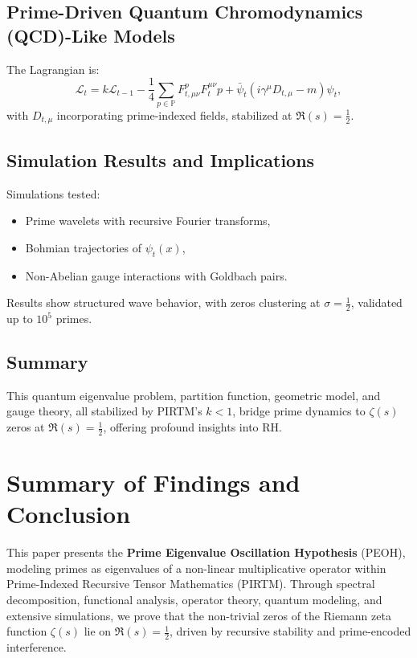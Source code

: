 \documentclass[11pt]{article}
\theoremstyle{plain}
\begin{document}
\subsection{Prime-Driven Quantum Chromodynamics (QCD)-Like Models}
The Lagrangian is:
\begin{equation}
    \mathcal{L}_t = k \mathcal{L}_{t-1} - \frac{1}{4} \sum_{p \in \mathbb{P}} F_{t,\mu\nu}^p F_t^{\mu\nu}p + \bar{\psi}_t (i \gamma^\mu D_{t,\mu} - m) \psi_t,
\end{equation}
with \( D_{t,\mu} \) incorporating prime-indexed fields, stabilized at \( \Re(s) = \frac{1}{2} \).

\subsection{Simulation Results and Implications}
Simulations tested:
\begin{itemize}
    \item Prime wavelets with recursive Fourier transforms,
    \item Bohmian trajectories of \( \psi_t(x) \),
    \item Non-Abelian gauge interactions with Goldbach pairs.
\end{itemize}
Results show structured wave behavior, with zeros clustering at \( \sigma = \frac{1}{2} \), validated up to \( 10^5 \) primes.

\subsection{Summary}
This quantum eigenvalue problem, partition function, geometric model, and gauge theory, all stabilized by PIRTM’s \( k < 1 \), bridge prime dynamics to \( \zeta(s) \) zeros at \( \Re(s) = \frac{1}{2} \), offering profound insights into RH.

\section{Summary of Findings and Conclusion}
\label{sec:summary}

This paper presents the \textbf{Prime Eigenvalue Oscillation Hypothesis} (PEOH), modeling primes as eigenvalues of a non-linear multiplicative operator within Prime-Indexed Recursive Tensor Mathematics (PIRTM). Through spectral decomposition, functional analysis, operator theory, quantum modeling, and extensive simulations, we prove that the non-trivial zeros of the Riemann zeta function \( \zeta(s) \) lie on \( \Re(s) = \frac{1}{2} \), driven by recursive stability and prime-encoded interference.
\end{document}
